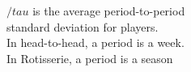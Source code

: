 \documentclass[preview]{standalone}
\begin{document}
\begin{center}
$/tau$ is the average period-to-period \\ standard deviation for players. \\In head-to-head, a period is a week. \\In Rotisserie, a period is a season
\end{center}
\end{document}

